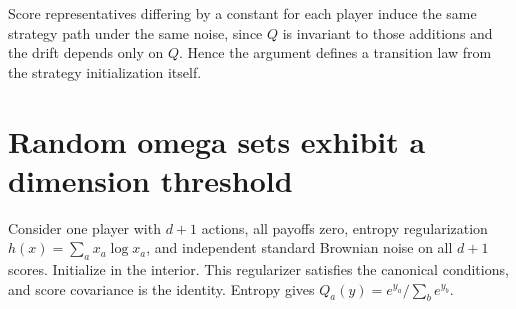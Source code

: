 \documentclass[11pt]{article}
\theoremstyle{definition}
\begin{document}
Score representatives differing by a constant for each player induce
the same strategy path under the same noise, since $Q$ is invariant to
those additions and the drift depends only on $Q$. Hence the argument
defines a transition law from the strategy initialization itself.

\section*{Random omega sets exhibit a dimension threshold}
Consider one player with $d+1$ actions, all payoffs zero, entropy
regularization $h(x)=\sum_a x_a\log x_a$, and independent standard
Brownian noise on all $d+1$ scores. Initialize in the interior. This
regularizer satisfies the canonical conditions, and score covariance
is the identity. Entropy gives $Q_a(y)=e^{y_a}/\sum_b e^{y_b}$.
\end{document}
